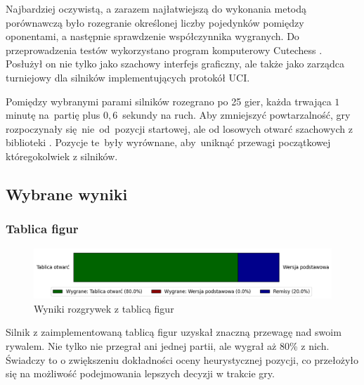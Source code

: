 Najbardziej oczywistą, a zarazem najłatwiejszą do wykonania metodą porównawczą było rozegranie określonej liczby pojedynków pomiędzy oponentami, a następnie sprawdzenie współczynnika wygranych.
Do przeprowadzenia testów wykorzystano program komputerowy Cutechess \cite*{cutechess}.
Posłużył on nie tylko jako szachowy interfejs graficzny, ale także jako zarządca turniejowy dla silników implementujących protokół UCI.

Pomiędzy wybranymi parami silników rozegrano po 25 gier, każda trwająca $1$ minutę na~partię plus $0,6$~sekundy na ruch.
Aby zmniejszyć powtarzalność, gry rozpoczynały się~nie~od~pozycji startowej, ale od losowych otwarć szachowych z biblioteki \cite{lichess-book}.
Pozycje te~były wyrównane, aby~uniknąć przewagi początkowej któregokolwiek z silników.


\subsection{Wybrane wyniki}\label{subsec:wybrane-wyniki}

\subsubsection{Tablica figur}
\begin{figure}[ht]
    \centering
    \includegraphics[width=1\linewidth]{rozdzialy/rozdzial03/1_porownanie-wersji-silnika/rysunki/wyniki-tablica}
    \caption{Wyniki rozgrywek z tablicą figur}
    \label{fig:wyniki-tablica}
\end{figure}
Silnik z zaimplementowaną tablicą figur uzyskał znaczną przewagę nad swoim rywalem.
Nie tylko nie przegrał ani jednej partii, ale wygrał aż 80\% z nich.
Świadczy to o zwiększeniu dokładności oceny heurystycznej pozycji, co przełożyło się na możliwość podejmowania lepszych decyzji w trakcie gry.



